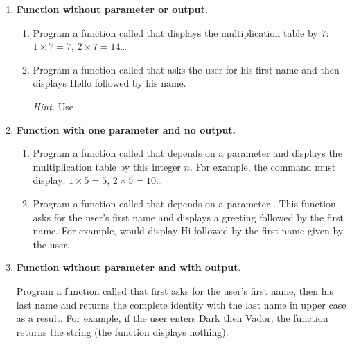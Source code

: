 \documentclass[11pt,class=report,crop=false]{standalone}
\begin{document}

\begin{activite}

\begin{enumerate}
  \item \textbf{Function without parameter or output.}
  \begin{enumerate}
    \item Program a function called  that displays the multiplication table by $7$: $1 \times 7 = 7$, $2\times 7 = 14$\ldots
    
    \item Program a function called  that asks the user for his first name and then displays \og{}Hello\fg{} followed by his name.
    
    \emph{Hint.} Use .
  \end{enumerate}

  \item \textbf{Function with one parameter and no output.}
  \begin{enumerate}
    \item Program a function called  that depends on a parameter  and displays the multiplication table by this integer $n$.
    For example, the command  must display: $1 \times 5 = 5$, $2\times 5 = 10$\ldots
    
    \item Program a function called  that depends on a parameter . This function asks for the user's first name and displays a greeting followed by the first name. For example,  would display \og{}Hi\fg{} followed by the first name given by the user.
  \end{enumerate}  
  
  \item \textbf{Function without parameter and with output.}
  
Program a function called  that first asks for the user's first name, then his last name and returns the complete identity with the last name in upper case as a result. For example, if the user enters \og{}Dark\fg{} then \og{}Vador\fg{}, the function returns the string  (the function displays nothing).


\end{enumerate}
\end{activite}
\end{document}
